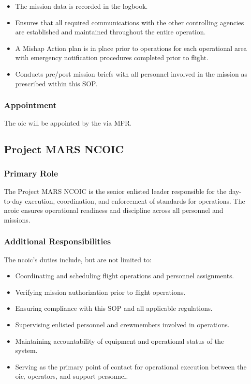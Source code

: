 \begin{itemize}
                \item The mission data is recorded in the logbook.

                \item Ensures that all required communications with the other controlling agencies are established and maintained throughout the entire operation.

                \item A Mishap Action plan is in place prior to operations for each operational area with emergency notification procedures completed prior to flight.

                \item Conducts pre/post mission briefs with all personnel involved in the mission as prescribed within this SOP.
            \end{itemize}
            
            \subsubsection{Appointment} The \projectmars{} \ac{oic} will be appointed by the  via MFR.

        \subsection{Project MARS NCOIC}\label{role:projectncoic}

            \subsubsection{Primary Role} The Project MARS NCOIC is the senior enlisted leader responsible for the day-to-day execution, coordination, and enforcement of standards for \projectmars{} operations. The \ac{ncoic} ensures operational readiness and discipline across all personnel and missions.

            \subsubsection{Additional Responsibilities} The \ac{ncoic}'s duties include, but are not limited to:
            \begin{itemize}
                \item Coordinating and scheduling flight operations and personnel assignments.
                \item Verifying mission authorization prior to flight operations.
                \item Ensuring compliance with this SOP and all applicable regulations.
                \item Supervising enlisted personnel and crewmembers involved in operations.
                \item Maintaining accountability of equipment and operational status of the system.
                \item Serving as the primary point of contact for operational execution between the \ac{oic}, operators, and support personnel.
            \end{itemize}
            
